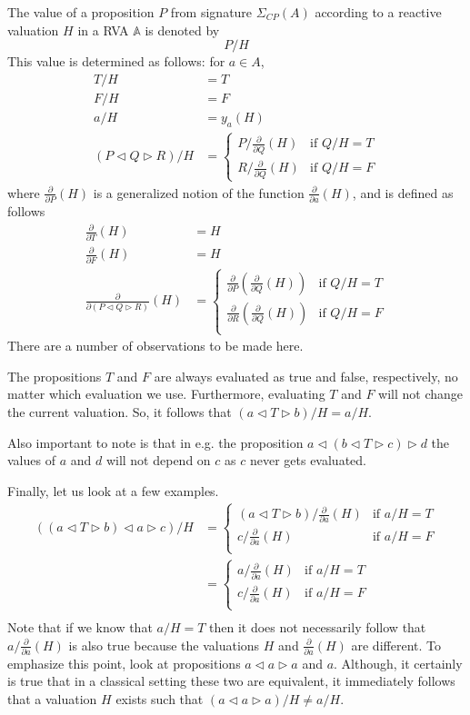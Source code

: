 \documentclass[a4paper,twoside,openright]{report}
\newcommand{\sig}{\ensuremath{\Sigma_{CP}(A)}}
\newcommand{\dd}[1]{\frac{\partial}{\partial #1}}
\newcommand{\lef}{\ensuremath{\triangleleft}}
\newcommand{\rig}{\ensuremath{\triangleright}}
\begin{document}
The value of a proposition $P$ from signature $\sig$ according to a reactive valuation $H$ in a RVA $\mathbb{A}$ is denoted by
\[
P/H
\]
This value is determined as follows: for $a\in A$,
\begin{align*}
	T/H &= T\\
	F/H &= F\\
	a/H &= y_a(H)\\
	(P\lef Q\rig R)/H &= 
	\begin{cases}
		P/\dd Q(H)&\text{if $Q/H=T$}\\
		R/\dd Q(H)&\text{if $Q/H=F$}
	\end{cases}
\end{align*}
where $\dd P(H)$ is a generalized notion of the function $\dd a(H)$, and is defined as follows
\begin{align*}
	\dd T(H) &= H\\
	\dd F(H) &= H\\
	\dd{(P\lef Q\rig R)}(H) &=
	\begin{cases}
		\dd P(\dd Q(H))&\text{if $Q/H=T$}\\
		\dd R(\dd Q(H))&\text{if $Q/H=F$}\\
	\end{cases}
\end{align*}
There are a number of observations to be made here.

The propositions $T$ and $F$ are always evaluated as true and false, respectively, no matter which evaluation we use. Furthermore, evaluating $T$ and $F$ will not change the current valuation. So, it follows that $(a\lef T\rig b)/H=a/H$.

Also important to note is that in e.g. the proposition $a\lef (b\lef T\rig c)\rig d$ the values of $a$ and $d$ will not depend on $c$ as $c$ never gets evaluated.

Finally, let us look at a few examples.
\begin{align*}
((a\lef T\rig b)\lef a\rig c)/H
&= \begin{cases}
(a\lef T\rig b)/\dd a(H) &\text{if $a/H=T$}\\
c/\dd a(H) &\text{if $a/H=F$}\\
\end{cases}\\
&= \begin{cases}
a/\dd a(H) &\text{if $a/H=T$}\\
c/\dd a(H) &\text{if $a/H=F$}\\
\end{cases}\\
\end{align*}
Note that if we know that $a/H=T$ then it does not necessarily follow that $a/\dd a(H)$ is also true because the valuations $H$ and $\dd a(H)$ are different. To emphasize this point, look at propositions $a\lef a\rig a$ and $a$. Although, it certainly is true that in a classical setting these two are equivalent, it immediately follows that a valuation $H$ exists such that $(a\lef a\rig a)/H\ne a/H$.
\end{document}
